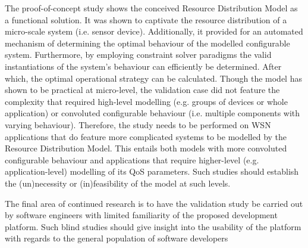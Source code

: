 The proof-of-concept study shows the conceived Resource Distribution Model as a functional solution. It was shown to captivate the resource distribution of a micro-scale system (i.e. sensor device). Additionally, it provided for an automated mechanism of determining the optimal behaviour of the modelled configurable system. Furthermore, by employing constraint solver paradigms the valid instantiations of the system's behaviour can efficiently be determined. After which, the optimal operational strategy can be calculated. Though the model has shown to be practical at micro-level, the validation case did not feature the complexity that required high-level modelling (e.g. groups of devices or whole application) or convoluted configurable behaviour (i.e. multiple components with varying behaviour). Therefore, the study needs to be performed on WSN applications that do feature more complicated systems to be modelled by the Resource Distribution Model. This entails both models with more convoluted configurable behaviour and applications that require higher-level (e.g. application-level) modelling of its QoS parameters. Such studies should establish the (un)necessity or (in)feasibility of the model at such levels.

The final area of continued research is to have the validation study be carried out by software engineers with limited familiarity of the proposed development platform. Such blind studies should give insight into the usability of the platform with regards to the general population of software developers
	

	
	


	

